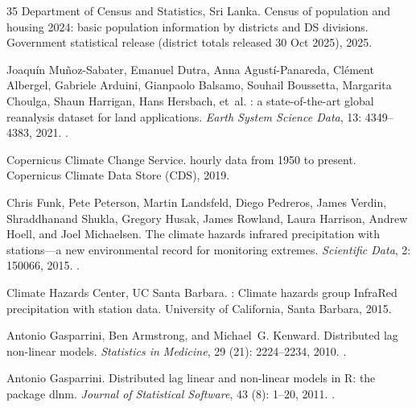 \documentclass[11pt,a4paper]{article}
\begin{document}
\begin{thebibliography}{35}
{Department of Census and Statistics, Sri Lanka}.
\newblock Census of population and housing 2024: basic population information
  by districts and {DS} divisions.
\newblock Government statistical release (district totals released 30 Oct
  2025), 2025.

Joaqu{\'i}n Mu{\~n}oz-Sabater, Emanuel Dutra, Anna Agust{\'i}-Panareda,
  Cl{\'e}ment Albergel, Gabriele Arduini, Gianpaolo Balsamo, Souhail Boussetta,
  Margarita Choulga, Shaun Harrigan, Hans Hersbach, et~al.
: a state-of-the-art global reanalysis dataset for land
  applications.
\newblock \emph{Earth System Science Data}, 13: 4349--4383, 2021.
\newblock {}.

{Copernicus Climate Change Service}.
 hourly data from 1950 to present.
\newblock Copernicus Climate Data Store (CDS), 2019.

Chris Funk, Pete Peterson, Martin Landsfeld, Diego Pedreros, James Verdin,
  Shraddhanand Shukla, Gregory Husak, James Rowland, Laura Harrison, Andrew
  Hoell, and Joel Michaelsen.
\newblock The climate hazards infrared precipitation with stations---a new
  environmental record for monitoring extremes.
\newblock \emph{Scientific Data}, 2: 150066, 2015.
\newblock {}.

{Climate Hazards Center, UC Santa Barbara}.
: Climate hazards group {InfraRed} precipitation with station
  data.
\newblock University of California, Santa Barbara, 2015.

Antonio Gasparrini, Ben Armstrong, and Michael~G. Kenward.
\newblock Distributed lag non-linear models.
\newblock \emph{Statistics in Medicine}, 29 (21): 2224--2234,
  2010.
\newblock {}.

Antonio Gasparrini.
\newblock Distributed lag linear and non-linear models in {R}: the package
  {dlnm}.
\newblock \emph{Journal of Statistical Software}, 43 (8):
  1--20, 2011.
\newblock {}.


\end{thebibliography}
\end{document}
